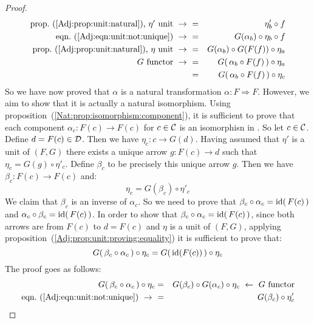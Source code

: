 \begin{proof}
\begin{eqnarray*}
            \mbox{prop.~(\ref{Adj:prop:unit:natural}), $\eta'$ unit}\ \to\ 
            &=&\eta'_{b}\circ f\\
            \mbox{eqn.~(\ref{Adj:eqn:unit:not:unique})}\ \to\ 
            &=&G(\alpha_{b})\circ\eta_{b}\circ f\\
            \mbox{prop.~(\ref{Adj:prop:unit:natural}), $\eta$ unit}\ \to\ 
            &=&G(\alpha_{b})\circ G(F(f))\circ\eta_{a}\\
            \mbox{$G$ functor}\ \to\ 
            &=&G(\,\alpha_{b}\circ F(f)\,)\circ\eta_{a}\\
            &=&G(\,\alpha_{b}\circ F(f)\,)\circ\eta_{c}\\
        \end{eqnarray*}
    So we have now proved that $\alpha$ is a natural transformation
    $\alpha:F\Rightarrow F$. However, we aim to show that it is actually
    a natural isomorphism. 
    Using proposition~(\ref{Nat:prop:isomorphism:component}), it is sufficient
    to prove that each component $\alpha_{c}:F(c)\to F(c)$ for $c\in\mbox{$\cal C$}$ is 
    an isomorphisn in \Dat. So let $c\in\mbox{$\cal C$}$. Define $d=F(c)\in\mbox{$\cal D$}$. Then we 
    have $\eta_{c}:c\to G(d)$. Having assumed that $\eta'$ is a unit of $(F,G)$ 
    there exists a unique arrow $g:F(c)\to d$ such that 
    $\eta_{c}=G(g)\circ\eta'_{c}$. Define $\beta_{c}$ to be precisely this 
    unique arrow $g$. Then we have $\beta_{c}:F(c)\to F(c)$ and:
        \begin{equation}\label{Adj:eqn:unit:not:unique:2}
            \eta_{c}=G(\beta_{c})\circ\eta'_{c}
        \end{equation}
    We claim that $\beta_{c}$ is an inverse of $\alpha_{c}$. So we need to prove 
    that $\beta_{c}\circ\alpha_{c}=\mbox{\rm id}(\,F(c)\,)$ and 
    $\alpha_{c}\circ\beta_{c}=\mbox{\rm id}(\,F(c)\,)$.
    In order to show that $\beta_{c}\circ\alpha_{c}=\mbox{\rm id}(\,F(c)\,)$, since both 
    arrows are from $F(c)$ to $d=F(c)$ and $\eta$ is a unit of $(F,G)$, applying
    proposition~(\ref{Adj:prop:unit:proving:equality}) it is sufficient to prove 
    that:
        \[
            G(\,\beta_{c}\circ\alpha_{c}\,)\circ\eta_{c} 
            = 
            G(\,\mbox{\rm id}(F(c))\,)\circ\eta_{c}
        \]
    The proof goes as follows:
        \begin{eqnarray*}G(\,\beta_{c}\circ\alpha_{c}\,)\circ\eta_{c}
            &=&G(\beta_{c})\circ G(\alpha_{c})\circ\eta_{c}
            \ \leftarrow\ \mbox{$G$ functor}\\
            \mbox{eqn.~(\ref{Adj:eqn:unit:not:unique})}\ \to\ 
            &=&G(\beta_{c})\circ\eta'_{c}\\

\end{eqnarray*}
\end{proof}
